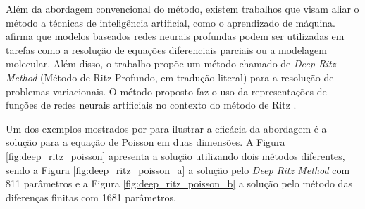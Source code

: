 \documentclass[
	12pt,				%
	openright,			%
    twoside,			%
	a4paper,			%
	english,			%
	french,				%
	spanish,			%
	brazil				%
	]{abntex2}
\numberwithin{lema}{chapter}
\numberwithin{teorema}{chapter}
\numberwithin{definicao}{chapter}
\numberwithin{exemplo}{chapter}
\numberwithin{figure}{chapter}
\begin{document}



Além da abordagem convencional do método, existem trabalhos que visam aliar o método a técnicas de inteligência artificial, como o aprendizado de máquina.  afirma que modelos baseados redes neurais profundas podem ser utilizadas em tarefas como a resolução de equações diferenciais parciais ou a modelagem molecular. Além disso, o trabalho propõe um método chamado de \textit{Deep Ritz Method} (Método de Ritz Profundo, em tradução literal) para a resolução de problemas variacionais. O método proposto faz o uso da representações de funções de redes neurais artificiais no contexto do método de Ritz \cite{deep_ritz}. 

Um dos exemplos mostrados por  para ilustrar a eficácia da abordagem é a solução para a equação de Poisson em duas dimensões. A Figura \ref{fig:deep_ritz_poisson} apresenta a solução utilizando dois métodos diferentes, sendo a Figura \ref{fig:deep_ritz_poisson_a} a solução pelo \textit{Deep Ritz Method} com 811 parâmetros e a Figura \ref{fig:deep_ritz_poisson_b} a solução pelo método das diferenças finitas com 1681 parâmetros.
\end{document}

